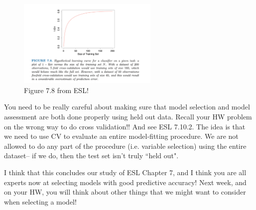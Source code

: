 \begin{figure}
\centering
\includegraphics[width=0.6\textwidth]{442_lecs/cv_esl.png}
\caption{Figure 7.8 from ESL!}
\label{fig_cv}	
\end{figure}

You need to be really careful about making sure that model selection and model assessment are both done properly using held out data. Recall your HW problem on the wrong way to do cross validation!! And see ESL 7.10.2. The idea is that we need to use CV to evaluate an entire model-fitting procedure. We are not allowed to do any part of the procedure (i.e. variable selection) using the entire dataset-- if we do, then the test set isn't truly ``held out".

I think that this concludes our study of ESL Chapter 7, and I think you are all experts now at selecting models with good predictive accuracy! Next week, and on your HW, you will think about other things that we might want to consider when selecting a model!










